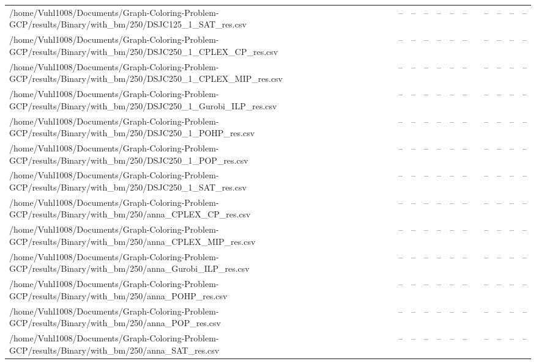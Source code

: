 \begin{table}[htbp]
\begin{tabular}{llllllllllll}
/home/Vuhl1008/Documents/Graph-Coloring-Problem-GCP/results/Binary/with\_bm/250/DSJC125\_1\_SAT\_res.csv & -- & -- & -- & -- & -- & -- & {} & -- & -- & -- & -- \\
/home/Vuhl1008/Documents/Graph-Coloring-Problem-GCP/results/Binary/with\_bm/250/DSJC250\_1\_CPLEX\_CP\_res.csv & -- & -- & -- & -- & -- & -- & {} & -- & -- & -- & -- \\
/home/Vuhl1008/Documents/Graph-Coloring-Problem-GCP/results/Binary/with\_bm/250/DSJC250\_1\_CPLEX\_MIP\_res.csv & -- & -- & -- & -- & -- & -- & {} & -- & -- & -- & -- \\
/home/Vuhl1008/Documents/Graph-Coloring-Problem-GCP/results/Binary/with\_bm/250/DSJC250\_1\_Gurobi\_ILP\_res.csv & -- & -- & -- & -- & -- & -- & {} & -- & -- & -- & -- \\
/home/Vuhl1008/Documents/Graph-Coloring-Problem-GCP/results/Binary/with\_bm/250/DSJC250\_1\_POHP\_res.csv & -- & -- & -- & -- & -- & -- & {} & -- & -- & -- & -- \\
/home/Vuhl1008/Documents/Graph-Coloring-Problem-GCP/results/Binary/with\_bm/250/DSJC250\_1\_POP\_res.csv & -- & -- & -- & -- & -- & -- & {} & -- & -- & -- & -- \\
/home/Vuhl1008/Documents/Graph-Coloring-Problem-GCP/results/Binary/with\_bm/250/DSJC250\_1\_SAT\_res.csv & -- & -- & -- & -- & -- & -- & {} & -- & -- & -- & -- \\
/home/Vuhl1008/Documents/Graph-Coloring-Problem-GCP/results/Binary/with\_bm/250/anna\_CPLEX\_CP\_res.csv & -- & -- & -- & -- & -- & -- & {} & -- & -- & -- & -- \\
/home/Vuhl1008/Documents/Graph-Coloring-Problem-GCP/results/Binary/with\_bm/250/anna\_CPLEX\_MIP\_res.csv & -- & -- & -- & -- & -- & -- & {} & -- & -- & -- & -- \\
/home/Vuhl1008/Documents/Graph-Coloring-Problem-GCP/results/Binary/with\_bm/250/anna\_Gurobi\_ILP\_res.csv & -- & -- & -- & -- & -- & -- & {} & -- & -- & -- & -- \\
/home/Vuhl1008/Documents/Graph-Coloring-Problem-GCP/results/Binary/with\_bm/250/anna\_POHP\_res.csv & -- & -- & -- & -- & -- & -- & {} & -- & -- & -- & -- \\
/home/Vuhl1008/Documents/Graph-Coloring-Problem-GCP/results/Binary/with\_bm/250/anna\_POP\_res.csv & -- & -- & -- & -- & -- & -- & {} & -- & -- & -- & -- \\
/home/Vuhl1008/Documents/Graph-Coloring-Problem-GCP/results/Binary/with\_bm/250/anna\_SAT\_res.csv & -- & -- & -- & -- & -- & -- & {} & -- & -- & -- & -- \\

\end{tabular}
\end{table}
